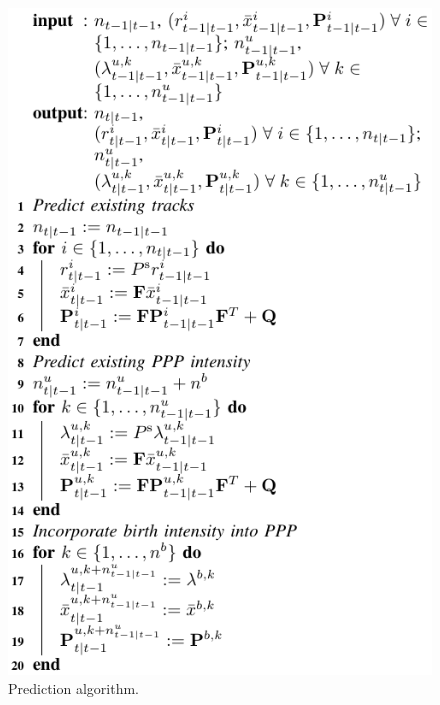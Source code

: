 \documentclass[journal,twoside]{IEEEtran}
\theoremstyle{plain}
\begin{document}
\begin{figure}
\includegraphics{figure7.pdf}
\caption{Prediction algorithm.}
\label{fig:algPrediction}
\end{figure}
\end{document}
